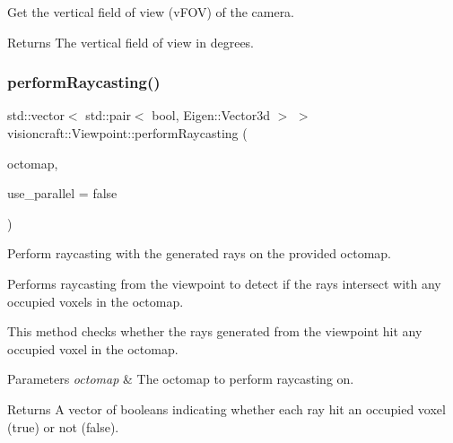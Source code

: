 Get the vertical field of view (v\+F\+OV) of the camera. 

\begin{DoxyReturn}{Returns}
The vertical field of view in degrees. 
\end{DoxyReturn}
\mbox{\label{classvisioncraft_1_1Viewpoint_a4f9f78eb518386325d8e0ade57c90fc3}} 
\subsubsection{\texorpdfstring{perform\+Raycasting()}{performRaycasting()}}
{\footnotesize\ttfamily std\+::vector$<$ std\+::pair$<$ bool, Eigen\+::\+Vector3d $>$ $>$ visioncraft\+::\+Viewpoint\+::perform\+Raycasting (\begin{DoxyParamCaption}\item[{const std\+::shared\+\_\+ptr$<$ octomap\+::\+Color\+Oc\+Tree $>$ \&}]{octomap,  }\item[{bool}]{use\+\_\+parallel = {\ttfamily false} }\end{DoxyParamCaption})}



Perform raycasting with the generated rays on the provided octomap. 

Performs raycasting from the viewpoint to detect if the rays intersect with any occupied voxels in the octomap.

This method checks whether the rays generated from the viewpoint hit any occupied voxel in the octomap.


\begin{DoxyParams}{Parameters}
{\em octomap} & The octomap to perform raycasting on. \\
\hline
\end{DoxyParams}
\begin{DoxyReturn}{Returns}
A vector of booleans indicating whether each ray hit an occupied voxel (true) or not (false).
\end{DoxyReturn}

